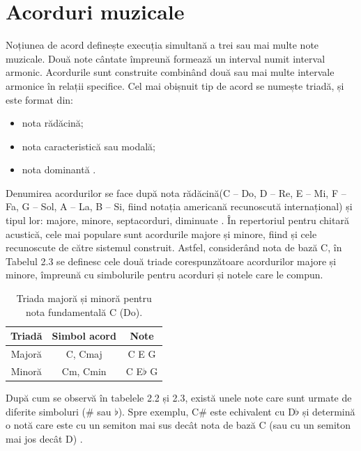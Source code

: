 \documentclass[a4paper,12pt]{report}
\begin{document}
\section{Acorduri muzicale}
Noțiunea de acord definește execuția simultană a trei sau mai 
multe note muzicale. Două note cântate împreună formează un interval 
numit interval armonic. Acordurile sunt construite combinând două 
sau mai multe intervale armonice în relații specifice. 
Cel mai obișnuit tip de acord se numește triadă, și este 
format din: 
\begin{itemize}
    \setlength\itemsep{0.2em}
    \item nota rădăcină;
    \item nota caracteristică sau modală;
    \item nota dominantă \cite{Bonvini-Recognition}.
\end{itemize}

Denumirea acordurilor se face după nota rădăcină(C – Do, D – Re, E – Mi, F – Fa, G – Sol, A – La, B – Si, 
fiind notația americană recunoscută internațional) și 
tipul lor: majore, minore, septacorduri, diminuate \cite{WEBSITE:chitara-notiuni-esentiale}. În 
repertoriul pentru chitară acustică, cele mai populare 
sunt acordurile majore și minore, fiind și cele recunoscute 
de către sistemul construit. Astfel, considerând nota de bază C,
în Tabelul 2.3 se definesc cele două triade corespunzătoare 
acordurilor majore și minore, împreună cu simbolurile pentru acorduri 
și notele care le compun.
\newpage

\begin{table}[h!]
    \begin{center}
        \begin{tabular}{ | c | c | c | }
            \hline 
                Triadă & Simbol acord & Note \\ 
                \hline \hline 
                Majoră & C, Cmaj &  C E G \\
                \hline  
                Minoră & Cm, Cmin & C E$\flat$ G \\
                \hline
        \end{tabular}
        \caption{Triada majoră și minoră pentru nota fundamentală C (Do).}
    \end{center}
\end{table}

După cum se observă în tabelele 2.2 și 2.3, există unele note 
care sunt urmate de diferite simboluri (\# sau $\flat$). 
Spre exemplu, C\# este echivalent cu D$\flat$ și determină 
o notă care este cu un semiton mai sus decât nota de bază C 
(sau cu un semiton mai jos decât D) \cite{WEBSITE:c-sharp-note}.
\end{document}
